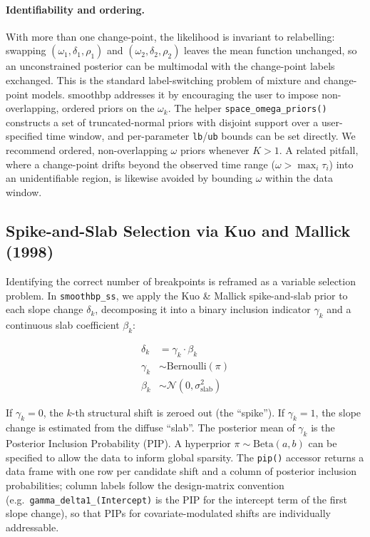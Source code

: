 \documentclass[12pt]{article}
\newcommand{\pkg}[1]{\textsf{#1}}
\newcommand{\code}[1]{\texttt{#1}}
\begin{document}
\paragraph{Identifiability and ordering.} With more than one change-point, the likelihood is invariant to relabelling: swapping $(\omega_1, \delta_1, \rho_1)$ and $(\omega_2, \delta_2, \rho_2)$ leaves the mean function unchanged, so an unconstrained posterior can be multimodal with the change-point labels exchanged. This is the standard label-switching problem of mixture and change-point models. \pkg{smoothbp} addresses it by encouraging the user to impose non-overlapping, ordered priors on the $\omega_k$. The helper \code{space\_omega\_priors()} constructs a set of truncated-normal priors with disjoint support over a user-specified time window, and per-parameter \code{lb}/\code{ub} bounds can be set directly. We recommend ordered, non-overlapping $\omega$ priors whenever $K > 1$. A related pitfall, where a change-point drifts beyond the observed time range ($\omega > \max_i \tau_i$) into an unidentifiable region, is likewise avoided by bounding $\omega$ within the data window.

\subsection{Spike-and-Slab Selection via Kuo and Mallick (1998)}

Identifying the correct number of breakpoints is reframed as a variable selection problem. In \code{smoothbp\_ss}, we apply the Kuo \& Mallick spike-and-slab prior \citep{kuomallick1998} to each slope change $\delta_k$, decomposing it into a binary inclusion indicator $\gamma_k$ and a continuous slab coefficient $\beta_{k}$:

\begin{align}
\delta_k &= \gamma_k \cdot \beta_{k} \\
\gamma_k &\sim \text{Bernoulli}(\pi) \\
\beta_{k} &\sim \mathcal{N}(0, \sigma_{\text{slab}}^2)
\end{align}

If $\gamma_k = 0$, the $k$-th structural shift is zeroed out (the ``spike''). If $\gamma_k = 1$, the slope change is estimated from the diffuse ``slab''. The posterior mean of $\gamma_k$ is the Posterior Inclusion Probability (PIP). A hyperprior $\pi \sim \text{Beta}(a, b)$ can be specified to allow the data to inform global sparsity. The \code{pip()} accessor returns a data frame with one row per candidate shift and a column of posterior inclusion probabilities; column labels follow the design-matrix convention (e.g.\ \code{gamma\_delta1\_(Intercept)} is the PIP for the intercept term of the first slope change), so that PIPs for covariate-modulated shifts are individually addressable.
\end{document}

